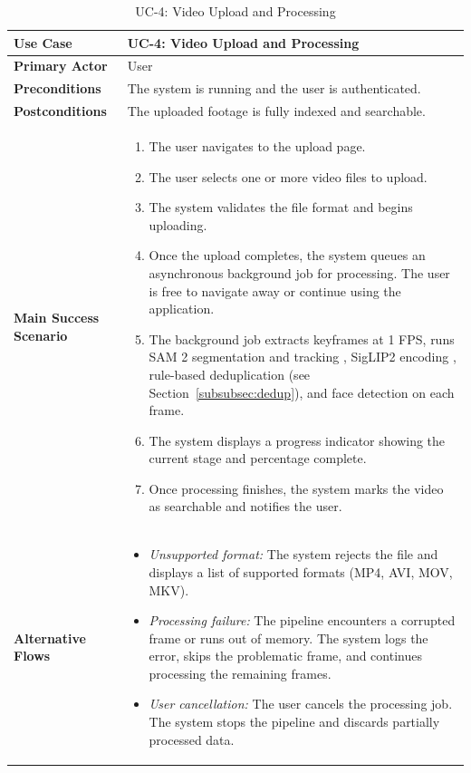 \begin{table}[H]
\centering
\begin{tabular}{|l|p{10cm}|}
\hline
\textbf{Use Case}       & UC-4: Video Upload and Processing \\ \hline
\textbf{Primary Actor}   & User \\ \hline
\textbf{Preconditions}   & The system is running and the user is authenticated. \\ \hline
\textbf{Postconditions}  & The uploaded footage is fully indexed and searchable. \\ \hline
\textbf{Main Success Scenario} &
    \begin{enumerate}[nosep, leftmargin=*]
        \item The user navigates to the upload page.
        \item The user selects one or more video files to upload.
        \item The system validates the file format and begins uploading.
        \item Once the upload completes, the system queues an asynchronous background job for processing. The user is free to navigate away or continue using the application.
        \item The background job extracts keyframes at 1 FPS, runs SAM 2 segmentation and tracking \cite{ravi2024sam2}, SigLIP2 encoding \cite{zhai2025siglip2}, rule-based deduplication (see Section~\ref{subsubsec:dedup}), and face detection \cite{deng2019arcface} on each frame.
        \item The system displays a progress indicator showing the current stage and percentage complete.
        \item Once processing finishes, the system marks the video as searchable and notifies the user.
    \end{enumerate} \\ \hline
\textbf{Alternative Flows} &
    \begin{itemize}[nosep, leftmargin=*]
        \item \textit{Unsupported format:} The system rejects the file and displays a list of supported formats (MP4, AVI, MOV, MKV).
        \item \textit{Processing failure:} The pipeline encounters a corrupted frame or runs out of memory. The system logs the error, skips the problematic frame, and continues processing the remaining frames.
        \item \textit{User cancellation:} The user cancels the processing job. The system stops the pipeline and discards partially processed data.
    \end{itemize} \\ \hline
\end{tabular}
\caption{UC-4: Video Upload and Processing}
\label{tab:uc4}
\end{table}

